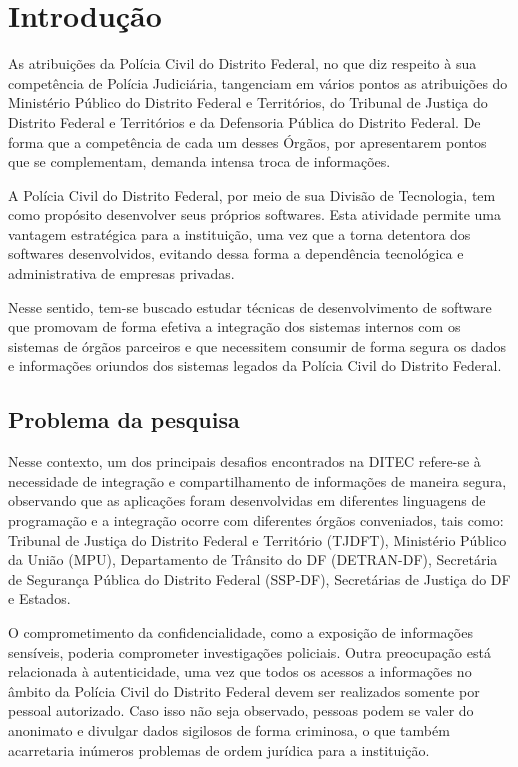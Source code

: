 \chapter{Introdução}\label{sec:introducao}
As atribuições da Polícia Civil do Distrito Federal, no que diz respeito à sua competência de Polícia Judiciária, tangenciam em vários pontos as atribuições do Ministério Público do Distrito Federal e Territórios, do Tribunal de Justiça do Distrito Federal e Territórios e da Defensoria Pública do Distrito Federal. De forma que a competência de cada um desses Órgãos, por apresentarem pontos que se complementam, demanda intensa troca de informações.

A Polícia Civil do Distrito Federal, por meio de sua Divisão de Tecnologia, tem como propósito desenvolver seus próprios softwares. Esta atividade permite uma vantagem estratégica para a instituição, uma vez que a torna detentora dos softwares desenvolvidos, evitando dessa forma a dependência tecnológica e administrativa de empresas privadas.

Nesse sentido, tem-se buscado estudar técnicas de desenvolvimento de software que promovam de forma efetiva a integração dos sistemas internos com os sistemas de órgãos parceiros e que necessitem consumir de forma segura os dados e informações oriundos dos sistemas legados da Polícia Civil do Distrito Federal.

\section{Problema da pesquisa}

Nesse contexto, um dos principais desafios encontrados na DITEC refere-se à necessidade de integração e compartilhamento de informações de maneira segura, observando que as aplicações foram desenvolvidas em diferentes linguagens de programação e a integração ocorre com diferentes órgãos conveniados, tais como: Tribunal de Justiça do Distrito Federal e Território (TJDFT), Ministério Público da União (MPU), Departamento de Trânsito do DF (DETRAN-DF), Secretária de Segurança Pública do Distrito Federal (SSP-DF), Secretárias de Justiça do DF e Estados.

O comprometimento da confidencialidade, como a exposição de informações sensíveis, poderia comprometer investigações policiais.
Outra preocupação está relacionada à autenticidade, uma vez que todos os acessos a informações no âmbito da Polícia Civil do Distrito Federal devem ser realizados somente por pessoal autorizado. Caso isso não seja observado, pessoas podem se valer do anonimato e divulgar dados sigilosos de forma criminosa, o que também acarretaria inúmeros problemas de ordem jurídica para a instituição.

